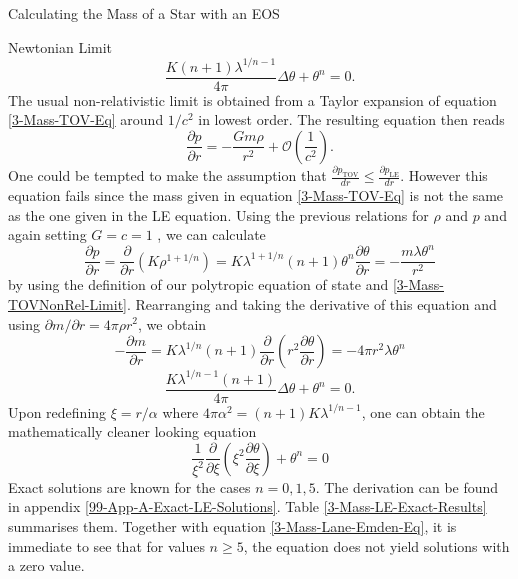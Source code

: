 \begin{section}{Calculating the Mass of a Star with an EOS}
\begin{subsection}{Newtonian Limit}
\begin{equation}
	\frac{K(n+1)\lambda^{1/n-1}}{4\pi}\Delta\theta+\theta^n=0.
\end{equation}
The usual non-relativistic limit is obtained from a Taylor expansion of equation \ref{3-Mass-TOV-Eq} around $1/c^2$ in lowest order. The resulting equation then reads
\begin{equation}
	\frac{\partial p}{\partial r} = -\frac{Gm\rho}{r^2} + \mathcal{O}\left(\frac{1}{c^2}\right).
	\label{3-Mass-TOVNonRel-Limit}
\end{equation}
One could be tempted to make the assumption that $\frac{\partial p_{\text{TOV}}}{dr} \leq \frac{\partial p_{\text{LE}}}{dr}.$ However this equation fails since the mass given in equation \ref{3-Mass-TOV-Eq} is not the same as the one given in the LE equation. Using the previous relations for $\rho$ and $p$ and again setting $G=c=1$ , we can calculate
\begin{equation}
	\frac{\partial p}{\partial r} = \frac{\partial}{\partial r}\left(K\rho^{1+1/n}\right)= K\lambda^{1+1/n}(n+1)\theta^n\frac{\partial\theta}{\partial r} = -\frac{m\lambda\theta^n}{r^2}
\end{equation}
by using the definition of our polytropic equation of state and \ref{3-Mass-TOVNonRel-Limit}. Rearranging and taking the derivative of this equation and using $\partial m/\partial r = 4\pi\rho r^2$, we obtain
\begin{equation}
	- \frac{\partial m}{\partial r} = K\lambda^{1/n}(n+1)\frac{\partial}{\partial r}\left(r^2\frac{\partial\theta}{\partial r}\right) = -4\pi r^2\lambda\theta^n
\end{equation}
\begin{equation}
	\frac{K\lambda^{1/n-1}(n+1)}{4\pi}\Delta\theta+\theta^n=0.
\end{equation}
Upon redefining $\xi=r/\alpha$ where $4\pi\alpha^2=(n+1)K\lambda^{1/n-1}$, one can obtain the mathematically cleaner looking equation
\begin{equation}
	\frac{1}{\xi^2}\frac{\partial}{\partial\xi}\left(\xi^2\frac{\partial\theta}{\partial\xi}\right) + \theta^n=0 \label{3-Mass-Lane-Emden-Eq}
\end{equation}
Exact solutions are known for the cases $n=0,1,5$. The derivation can be found in appendix \ref{99-App-A-Exact-LE-Solutions}. Table \ref{3-Mass-LE-Exact-Results} summarises them. Together with equation \ref{3-Mass-Lane-Emden-Eq}, it is immediate to see that for values $n\geq5$, the equation does not yield solutions with a zero value.
\begin{figure}[H]

\end{figure}
\end{subsection}
\end{section}
